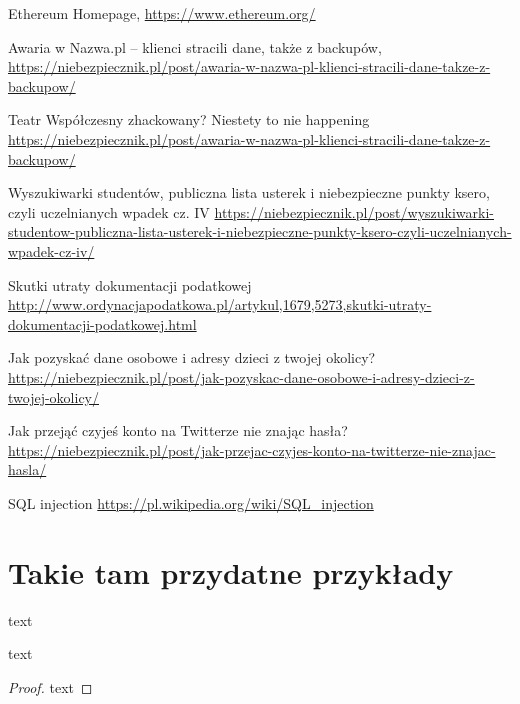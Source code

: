 \documentclass[]{llncs}
\begin{document}
%
%
%
% 
% 
%
\begin{thebibliography}{8}
   Ethereum Homepage,
  \url{https://www.ethereum.org/}

   Awaria w Nazwa.pl – klienci stracili dane, także z backupów,
  \url{https://niebezpiecznik.pl/post/awaria-w-nazwa-pl-klienci-stracili-dane-takze-z-backupow/}

   Teatr Współczesny zhackowany? Niestety to nie happening
  \url{https://niebezpiecznik.pl/post/awaria-w-nazwa-pl-klienci-stracili-dane-takze-z-backupow/}

   Wyszukiwarki studentów, publiczna lista usterek i niebezpieczne punkty ksero, czyli uczelnianych wpadek cz. IV
  \url{https://niebezpiecznik.pl/post/wyszukiwarki-studentow-publiczna-lista-usterek-i-niebezpieczne-punkty-ksero-czyli-uczelnianych-wpadek-cz-iv/}

   Skutki utraty dokumentacji podatkowej
  \url{http://www.ordynacjapodatkowa.pl/artykul,1679,5273,skutki-utraty-dokumentacji-podatkowej.html}

   Jak pozyskać dane osobowe i adresy dzieci z twojej okolicy?
  \url{https://niebezpiecznik.pl/post/jak-pozyskac-dane-osobowe-i-adresy-dzieci-z-twojej-okolicy/}

   Jak przejąć czyjeś konto na Twitterze nie znając hasła?
  \url{https://niebezpiecznik.pl/post/jak-przejac-czyjes-konto-na-twitterze-nie-znajac-hasla/}

   SQL injection
  \url{https://pl.wikipedia.org/wiki/SQL_injection}

\end{thebibliography}




\newpage
\newpage

\section{Takie tam przydatne przykłady}
\begin{definition} text \end{definition}
\begin{case} text \end{case}
\begin{proof} text \end{proof}
\end{document}
